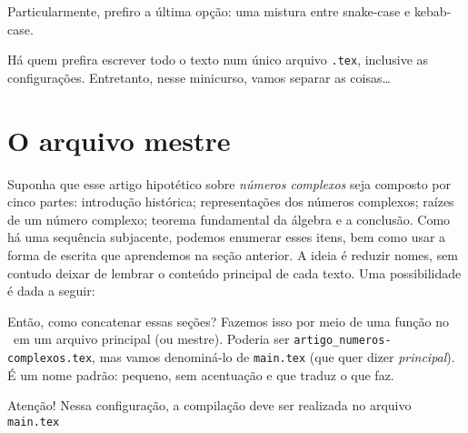 
Particularmente, prefiro a última opção: uma mistura entre \textsf{snake-case} 
e \textsf{kebab-case}. 

Há quem prefira escrever todo o texto num único arquivo \texttt{.tex}, 
inclusive as configurações. 
Entretanto, nesse minicurso, vamos separar as coisas\ldots 

\section{O arquivo mestre} %

Suponha que esse artigo hipotético sobre \textit{números complexos} seja 
composto por cinco partes: 
introdução histórica; 
representações dos números complexos; 
raízes de um número complexo; 
teorema fundamental da álgebra e a 
conclusão. 
Como há uma sequência subjacente, podemos enumerar esses itens, bem como usar 
a forma de escrita que aprendemos na seção anterior. 
A ideia é reduzir nomes, sem contudo deixar de lembrar o conteúdo principal de 
cada texto. 
Uma possibilidade é dada a seguir:


Então, como concatenar essas seções?
Fazemos isso por meio de uma função no \LaTeXX\ em um arquivo principal (ou mestre). 
Poderia ser \texttt{artigo\_numeros-complexos.tex}, mas vamos denominá-lo de 
\texttt{main.tex} (que quer dizer \textit{principal}). 
É um nome padrão: pequeno, sem acentuação e que traduz o que faz. 

\begin{atencao}{Atenção!}{\exclamacao}
  \sffamily
  Nessa configuração, a compilação deve ser realizada no arquivo\; \texttt{main.tex}
\end{atencao}
